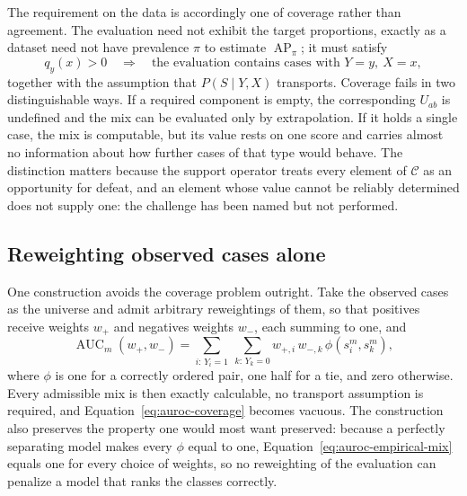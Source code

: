 \documentclass[11pt]{article}
\newcommand{\AP}{\operatorname{AP}}
\newcommand{\CSet}{\mathcal{C}}
\theoremstyle{remark}
\begin{document}
The requirement on the data is accordingly one of coverage rather than
agreement. The evaluation need not exhibit the target proportions, exactly as a
dataset need not have prevalence $\pi$ to estimate $\AP_\pi$; it must satisfy
\begin{equation}
q_y(x)>0
\quad\Longrightarrow\quad
\text{the evaluation contains cases with }Y=y,\ X=x,
\label{eq:auroc-coverage}
\end{equation}
together with the assumption that $P(S\mid Y,X)$ transports. Coverage fails in
two distinguishable ways. If a required component is empty, the corresponding
$U_{ab}$ is undefined and the mix can be evaluated only by extrapolation. If it
holds a single case, the mix is computable, but its value rests on one score
and carries almost no information about how further cases of that type would
behave. The distinction matters because the support operator treats every
element of $\CSet$ as an opportunity for defeat, and an element whose value
cannot be reliably determined does not supply one: the challenge has been named
but not performed.

\subsection{Reweighting observed cases alone}

One construction avoids the coverage problem outright. Take the observed cases
as the universe and admit arbitrary reweightings of them, so that positives
receive weights $w_+$ and negatives weights $w_-$, each summing to one, and
\begin{equation}
\operatorname{AUC}_m(w_+,w_-)
=
\sum_{i:\,Y_i=1}\ \sum_{k:\,Y_k=0}
w_{+,i}\,w_{-,k}\,\phi(s_i^m,s_k^m),
\label{eq:auroc-empirical-mix}
\end{equation}
where $\phi$ is one for a correctly ordered pair, one half for a tie, and zero
otherwise. Every admissible mix is then exactly calculable, no transport
assumption is required, and Equation~\eqref{eq:auroc-coverage} becomes vacuous.
The construction also preserves the property one would most want preserved:
because a perfectly separating model makes every $\phi$ equal to one,
Equation~\eqref{eq:auroc-empirical-mix} equals one for every choice of weights,
so no reweighting of the evaluation can penalize a model that ranks the classes
correctly.
\end{document}
